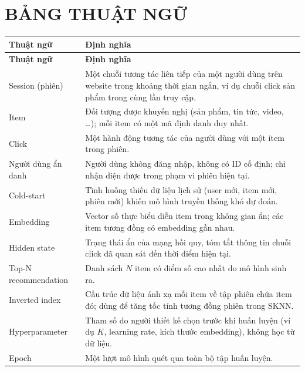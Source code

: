 \documentclass[12pt, a4paper]{article}
\begin{document}
\newpage
{}
{}
\section*{BẢNG THUẬT NGỮ}

\begin{longtable}{@{}p{4.2cm} p{11cm}@{}}
\toprule
\textbf{Thuật ngữ} & \textbf{Định nghĩa} \\
\midrule
\endfirsthead
\toprule
\textbf{Thuật ngữ} & \textbf{Định nghĩa} \\
\midrule
\endhead
\bottomrule
\endfoot

Session (phiên)          & Một chuỗi tương tác liên tiếp của một người dùng trên website trong khoảng thời gian ngắn, ví dụ chuỗi click sản phẩm trong cùng lần truy cập. \\
Item                     & Đối tượng được khuyến nghị (sản phẩm, tin tức, video, …); mỗi item có một mã định danh duy nhất. \\
Click                    & Một hành động tương tác của người dùng với một item trong phiên. \\
Người dùng ẩn danh       & Người dùng không đăng nhập, không có ID cố định; chỉ nhận diện được trong phạm vi phiên hiện tại. \\
Cold-start               & Tình huống thiếu dữ liệu lịch sử (user mới, item mới, phiên mới) khiến mô hình truyền thống khó dự đoán. \\
Embedding                & Vector số thực biểu diễn item trong không gian ẩn; các item tương đồng có embedding gần nhau. \\
Hidden state             & Trạng thái ẩn của mạng hồi quy, tóm tắt thông tin chuỗi click đã quan sát đến thời điểm hiện tại. \\
Top-N recommendation     & Danh sách $N$ item có điểm số cao nhất do mô hình sinh ra. \\
Inverted index           & Cấu trúc dữ liệu ánh xạ mỗi item về tập phiên chứa item đó; dùng để tăng tốc tính tương đồng phiên trong SKNN. \\
Hyperparameter           & Tham số do người thiết kế chọn trước khi huấn luyện (ví dụ $K$, learning rate, kích thước embedding), không học từ dữ liệu. \\
Epoch                    & Một lượt mô hình quét qua toàn bộ tập huấn luyện. \\

\end{longtable}
\end{document}
